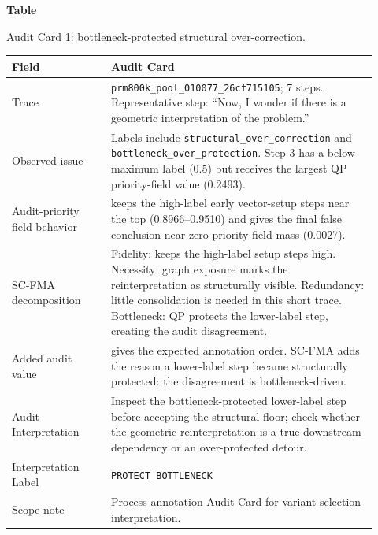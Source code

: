 \par\medskip
{}\label{tab:audit-card-geometric}
\noindent\textbf{Table~\thetable}\par
\noindent Audit Card 1: bottleneck-protected structural over-correction.
\begin{center}
\small
\renewcommand{\arraystretch}{1.08}
\begin{tabular}{p{0.25\linewidth}p{0.67\linewidth}}
\toprule
\textbf{Field} & \textbf{Audit Card} \\
\midrule
Trace & \texttt{prm800k\_pool\_010077\_26cf715105}; 7 steps. Representative step: ``Now, I wonder if there is a geometric interpretation of the problem.'' \\
Observed issue & Labels include \texttt{structural\_over\_correction} and \texttt{bottleneck\_over\_protection}. Step 3 has a below-maximum label (0.5) but receives the largest QP priority-field value (0.2493). \\
Audit-priority field behavior & \wstruct{} keeps the high-label early vector-setup steps near the top (0.8966--0.9510) and gives the final false conclusion near-zero priority-field mass (0.0027). \\
SC-FMA decomposition & Fidelity: \wstruct{} keeps the high-label setup steps high. Necessity: graph exposure marks the reinterpretation as structurally visible. Redundancy: little consolidation is needed in this short trace. Bottleneck: QP protects the lower-label step, creating the audit disagreement. \\
Added audit value & \wstruct{} gives the expected annotation order. SC-FMA adds the reason a lower-label step became structurally protected: the disagreement is bottleneck-driven. \\
Audit Interpretation & Inspect the bottleneck-protected lower-label step before accepting the structural floor; check whether the geometric reinterpretation is a true downstream dependency or an over-protected detour. \\
Interpretation Label & \texttt{PROTECT\_BOTTLENECK} \\
Scope note & Process-annotation Audit Card for variant-selection interpretation. \\
\bottomrule
\end{tabular}
\end{center}
\medskip

